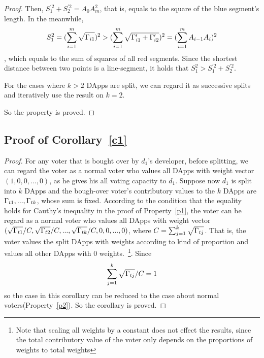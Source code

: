 \begin{proof}
   	Then, $S_1^{'2}+S_2^{'2}=A_0A_m^2$, that is, equals to the square of the blue segment's length. In the meanwhile, 
   	 $$S_1^2 = (\sum_{i=1}^m \sqrt{\Gamma_{i1}})^2 > (\sum_{i=1}^m \sqrt{\Gamma'_{i1}+\Gamma'_{i2}})^2 = (\sum_{i=1}^m A_{i-1}A_i)^2$$,
   	 which equals to the sum of squares of all red segments. Since the shortest distance between two points is a line-segment, it holds that $S_1^2 >S_1^{'2}+S_2^{'2}$.
   	 
   	 For the cases where $k>2$ DApps are split, 	we can regard it as successive splits and iteratively use the result on $k=2$. 
   	 
   	 So the property is proved.
   	 
\end{proof}

\subsection{Proof of Corollary~\ref{c1}}
\label{subsection:proof3}
\begin{proof}
	For any voter that is bought over by $d_1$'s developer, before splitting, we can regard the voter as a normal voter who values all DApps with weight vector $(1,0,0,...,0)$, as he gives his all voting capacity to $d_1$. Suppose now $d_1$ is split into $k$ DApps and the bough-over voter's contributory values to the $k$ DApps are $\Gamma_{t1},...,\Gamma_{tk}$, whose sum is fixed. According to the condition that the equality holds for Cauthy's inequality in the proof of Property~\ref{p1}, the voter can be regard as a normal voter who values all DApps with weight vector $(\sqrt{\Gamma_{t1}}/C,\sqrt{\Gamma_{t2}}/C,...,\sqrt{\Gamma_{tk}}/C,0,0,...,0)$, where $C=\sum_{j=1}^k \sqrt{\Gamma_{tj}}$. That is, the voter values the split DApps with weights according to kind of proportion and values all other DApps with 0 weights.~\footnote{Note that scaling all weights by a constant does not effect the results, since the total contributory value of the voter only depends on the proportions of weights to total weights}. Since
		$$\sum_{j=1}^k \sqrt{\Gamma_{tj}}/C =1$$
	so the case in this corollary can be reduced to the case about normal voters(Property~\ref{p2}). So the corollary is proved.
\end{proof}


